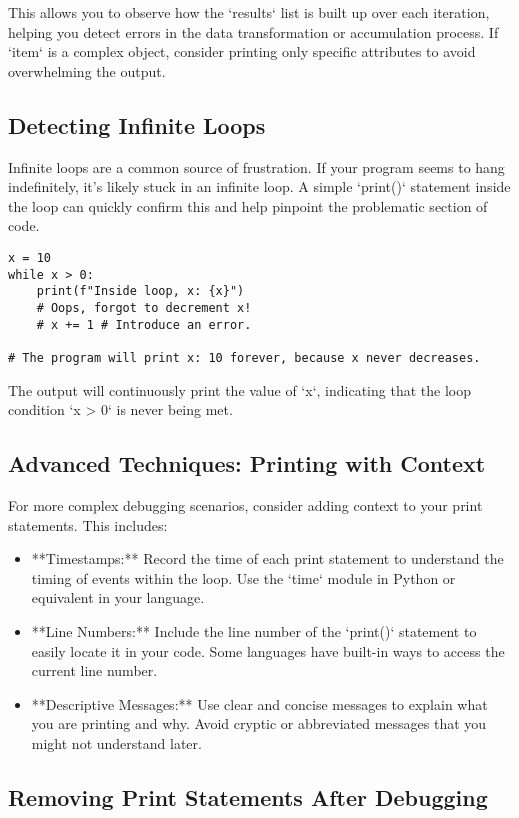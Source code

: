 \documentclass{article}
\begin{document}
{{{This allows you to observe how the `results` list is built up over each iteration, helping you detect errors in the data transformation or accumulation process. If `item` is a complex object, consider printing only specific attributes to avoid overwhelming the output.

\subsection*{Detecting Infinite Loops}

Infinite loops are a common source of frustration.  If your program seems to hang indefinitely, it's likely stuck in an infinite loop. A simple `print()` statement inside the loop can quickly confirm this and help pinpoint the problematic section of code.

\begin{verbatim}
x = 10
while x > 0:
    print(f"Inside loop, x: {x}")
    # Oops, forgot to decrement x!
    # x += 1 # Introduce an error.

# The program will print x: 10 forever, because x never decreases.
\end{verbatim}
The output will continuously print the value of `x`, indicating that the loop condition `x > 0` is never being met.

\subsection*{Advanced Techniques: Printing with Context}

For more complex debugging scenarios, consider adding context to your print statements. This includes:

\begin{itemize}
    \item **Timestamps:**  Record the time of each print statement to understand the timing of events within the loop.  Use the `time` module in Python or equivalent in your language.
    \item **Line Numbers:** Include the line number of the `print()` statement to easily locate it in your code.  Some languages have built-in ways to access the current line number.
    \item **Descriptive Messages:**  Use clear and concise messages to explain what you are printing and why.  Avoid cryptic or abbreviated messages that you might not understand later.
\end{itemize}

\subsection*{Removing Print Statements After Debugging}

}}}
\end{document}
